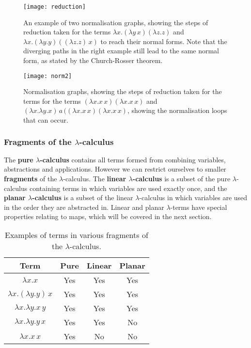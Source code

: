 \documentclass[11pt]{article}
\begin{document}
\begin{figure}
    \centering
    \texttt{[image: reduction]}
    \caption{An example of two normalisation graphs, showing the steps of reduction taken for the terms $\lambda x. (\lambda y \, x) (\lambda z. z)$ and $\lambda x. (\lambda y. y) ((\lambda z. z) \, x)$ to reach their normal forms. Note that the diverging paths in the right example still lead to the same normal form, as stated by the Church-Rosser theorem.}
    \label{fig:normgraphs}
\end{figure}

\begin{figure}
    \centering
    \texttt{[image: norm2]}
    \caption{Normalisation graphs, showing the steps of reduction taken for the terms for the terms $(\lambda x. x \, x)(\lambda x. x \, x)$ and $(\lambda x. \lambda y. x) \, a \, ((\lambda x. x \, x)(\lambda x. x \, x)$, showing the normalisation loops that can occur.}
    \label{fig:normgraphs2}
\end{figure}

\subsubsection{Fragments of the \texorpdfstring{$\lambda$}{lambda}-calculus}
The \textbf{pure $\lambda$-calculus} contains all terms formed from combining variables, abstractions and applications. However we can restrict ourselves to smaller \textbf{fragments} of the $\lambda$-calculus. The \textbf{linear $\lambda$-calculus} is a subset of the pure $\lambda$-calculus containing terms in which variables are used exactly once, and the \textbf{planar $\lambda$-calculus} is a subset of the linear $\lambda$-calculus in which variables are used in the order they are abstracted in. Linear and planar $\lambda$-terms have special properties relating to maps, which will be covered in the next section.

\begin{table}
    \centering
    \begin{tabular}{|c|c|c|c|}
        \hline
        \textbf{Term} & \textbf{Pure} & \textbf{Linear} & \textbf{Planar} \\
        \hline
        $\lambda x. x$ & Yes & Yes & Yes \\
        \hline
        $\lambda x. (\lambda y. y) \, x$ & Yes & Yes & Yes \\
        \hline
        $\lambda x.\lambda y. x \, y$ & Yes & Yes & Yes \\
        \hline
        $\lambda x. \lambda y. y \, x$ & Yes & Yes & No \\
        \hline
        $\lambda x. x \, x$ & Yes & No & No \\
        \hline
    \end{tabular}
    \caption{Examples of terms in various fragments of the $\lambda$-calculus.}
    \label{tab:fragments}
\end{table}
\end{document}
